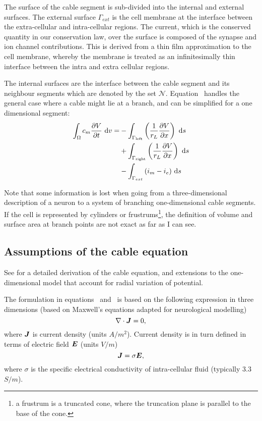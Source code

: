 The surface of the cable segment is sub-divided into the internal and external surfaces.
The external surface $\Gamma_{ext}$ is the cell membrane at the interface between the extra-cellular and intra-cellular regions.
The current, which is the conserved quantity in our conservation law, over the surface is composed of the synapse and ion channel contributions.
This is derived from a thin film approximation to the cell membrane, whereby the membrane is treated as an infinitesimally thin interface between the intra and extra cellular regions.

The internal surfaces are the interface between the cable segment and its neighbour segments which are denoted by the set $\mathcal N$.
Equation~ handles the general case where a cable might lie at a branch, and can be simplified for a one dimensional segment:
\begin{align}
    \int_{\Omega}{c_m \frac{\partial{V}}{\partial{t}} } ~\text{d}{v} =
        & - \int_{\Gamma_{\text{left}}}  \left( \frac{1}{r_L}\frac{\partial{V}}{\partial{x}} \right) ~\text{d}{s} \nonumber \\
        & + \int_{\Gamma_{\text{right}}} \left( \frac{1}{r_L}\frac{\partial{V}}{\partial{x}} \right) ~\text{d}{s} \nonumber \\
        & - \int_{\Gamma_{ext}} {(i_m - i_e)} ~\text{d}{s} \nonumber
\end{align}

Note that some information is lost when going from a three-dimensional description of a neuron to a system of branching one-dimensional cable segments.
If the cell is represented by cylinders or frustrums\footnote{a frustrum is a truncated cone, where the truncation plane is parallel to the base of the cone.}, the definition of volume and surface area at branch points are not exact as far as I can see.

\subsection{Assumptions of the cable equation}
See \cite{lindsay_2004} for a detailed derivation of the cable equation, and extensions to the one-dimensional model that account for radial variation of potential.

The formulation in equations~ and~ is based on the following expression in three dimensions (based on Maxwell's equations adapted for neurological modelling)
\begin{equation}
    \nabla \cdot \bm{J} = 0,
\end{equation}
where $\bm{J}$ is current density (units $A/m^2$).
Current density is in turn defined in terms of electric field $\bm{E}$ (units $V/m$)
\begin{equation}
    \bm{J} = \sigma \bm{E},
\end{equation}
where $\sigma$ is the specific electrical conductivity of intra-cellular fluid (typically 3.3 $S/m$).

